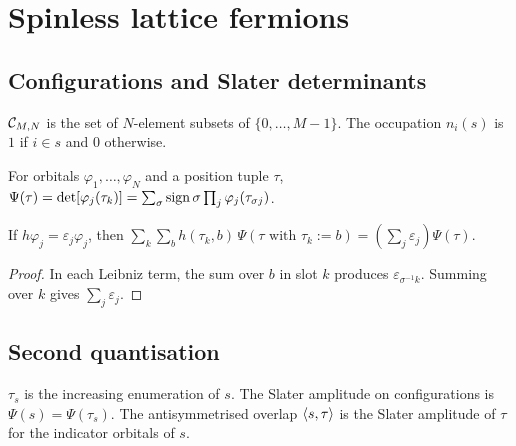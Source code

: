 \chapter{Spinless lattice fermions}
\label{chap:fermions}

\section{Configurations and Slater determinants}

\begin{definition}[Configurations]
  \label{def:Conf}
  \leanok
  $\mathcal{C}_{M,N}$ is the set of $N$-element subsets of $\{0,\dots,M-1\}$. The occupation $n_i(s)$ is $1$ if
  $i\in s$ and $0$ otherwise.
\end{definition}

\begin{definition}
  \label{def:slater}
  \leanok
  For orbitals $\varphi_1,\dots,\varphi_N$ and a position tuple $\tau$,
  $\Psi(\tau)=\det[\varphi_j(\tau_k)]=\sum_\sigma\operatorname{sign}\sigma\prod_j\varphi_j(\tau_{\sigma j})$.
\end{definition}

\begin{theorem}
  \label{thm:slater_eigen}
  \leanok
  If $h\varphi_j=\varepsilon_j\varphi_j$, then
  $\sum_k\sum_b h(\tau_k,b)\,\Psi(\tau\text{ with }\tau_k:=b)=(\sum_j\varepsilon_j)\Psi(\tau)$.
\end{theorem}
\begin{proof}
  \leanok
  In each Leibniz term, the sum over $b$ in slot $k$ produces $\varepsilon_{\sigma^{-1}k}$.
  Summing over $k$ gives $\sum_j\varepsilon_j$.
\end{proof}

\section{Second quantisation}

\begin{definition}
  \label{def:amp}
  \leanok
  $\tau_s$ is the increasing enumeration of $s$. The Slater amplitude on configurations is
  $\Psi(s)=\Psi(\tau_s)$. The antisymmetrised overlap $\langle s, \tau\rangle$ is the Slater amplitude of $\tau$ for
  the indicator orbitals of $s$.
\end{definition}

